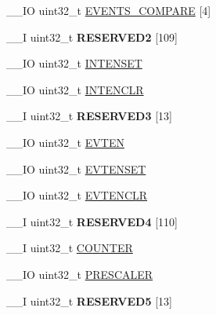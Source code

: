 \begin{DoxyCompactItemize}
\item 
\+\_\+\+\_\+\+I\+O uint32\+\_\+t \hyperlink{struct_n_r_f___r_t_c___type_a282a8685698382ed088f5d9bb81d2319}{E\+V\+E\+N\+T\+S\+\_\+\+C\+O\+M\+P\+A\+R\+E} \mbox{[}4\mbox{]}
\item 
\hypertarget{struct_n_r_f___r_t_c___type_a4301abecc999a2b4e746b1287aa7eb22}{}\+\_\+\+\_\+\+I uint32\+\_\+t {\bfseries R\+E\+S\+E\+R\+V\+E\+D2} \mbox{[}109\mbox{]}\label{struct_n_r_f___r_t_c___type_a4301abecc999a2b4e746b1287aa7eb22}

\item 
\+\_\+\+\_\+\+I\+O uint32\+\_\+t \hyperlink{struct_n_r_f___r_t_c___type_af0d6747fd8cfd233f1e5e78cc72c0d14}{I\+N\+T\+E\+N\+S\+E\+T}
\item 
\+\_\+\+\_\+\+I\+O uint32\+\_\+t \hyperlink{struct_n_r_f___r_t_c___type_a4cc5c240f6235c4d35675eb21718659d}{I\+N\+T\+E\+N\+C\+L\+R}
\item 
\hypertarget{struct_n_r_f___r_t_c___type_a5090e563b5b028cd730ad367218420bb}{}\+\_\+\+\_\+\+I uint32\+\_\+t {\bfseries R\+E\+S\+E\+R\+V\+E\+D3} \mbox{[}13\mbox{]}\label{struct_n_r_f___r_t_c___type_a5090e563b5b028cd730ad367218420bb}

\item 
\+\_\+\+\_\+\+I\+O uint32\+\_\+t \hyperlink{struct_n_r_f___r_t_c___type_a3e5fe08c9ca0ed938c102eb78e5c6dc9}{E\+V\+T\+E\+N}
\item 
\+\_\+\+\_\+\+I\+O uint32\+\_\+t \hyperlink{struct_n_r_f___r_t_c___type_a6c39af44d51729919f19f386605c55a1}{E\+V\+T\+E\+N\+S\+E\+T}
\item 
\+\_\+\+\_\+\+I\+O uint32\+\_\+t \hyperlink{struct_n_r_f___r_t_c___type_aebf19f47f217ef8efc8d70f97d84a1e5}{E\+V\+T\+E\+N\+C\+L\+R}
\item 
\hypertarget{struct_n_r_f___r_t_c___type_a4c5104060596cc5516095abbe6a08316}{}\+\_\+\+\_\+\+I uint32\+\_\+t {\bfseries R\+E\+S\+E\+R\+V\+E\+D4} \mbox{[}110\mbox{]}\label{struct_n_r_f___r_t_c___type_a4c5104060596cc5516095abbe6a08316}

\item 
\+\_\+\+\_\+\+I uint32\+\_\+t \hyperlink{struct_n_r_f___r_t_c___type_a21385db62b0f5fb972474617ca8e51e0}{C\+O\+U\+N\+T\+E\+R}
\item 
\+\_\+\+\_\+\+I\+O uint32\+\_\+t \hyperlink{struct_n_r_f___r_t_c___type_afd4b53b8c7077f3ab5949e472748dc0b}{P\+R\+E\+S\+C\+A\+L\+E\+R}
\item 
\hypertarget{struct_n_r_f___r_t_c___type_ab1aa60486bf69daf5bfda4f5742e0938}{}\+\_\+\+\_\+\+I uint32\+\_\+t {\bfseries R\+E\+S\+E\+R\+V\+E\+D5} \mbox{[}13\mbox{]}\label{struct_n_r_f___r_t_c___type_ab1aa60486bf69daf5bfda4f5742e0938}


\end{DoxyCompactItemize}
